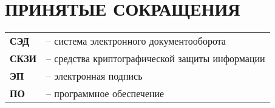 \chapter*{ПРИНЯТЫЕ СОКРАЩЕНИЯ}							%

\begin{tabular}{ll}
\textbf{СЭД} & -- система электронного документооборота \\
\textbf{СКЗИ} & -- средства криптографической защиты информации \\
\textbf{ЭП} & -- электронная подпись \\
\textbf{ПО} & -- программное обеспечение \\
\end{tabular}


\clearpage